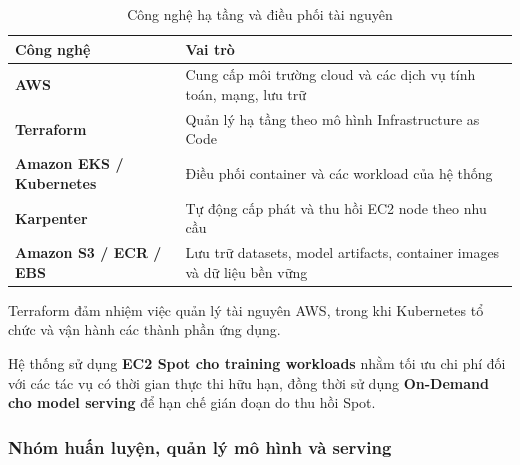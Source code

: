 \begin{table}[!htbp]\centering
\fontsize{12}{15}\selectfont{}
\setlength{\tabcolsep}{4pt}\setlength{\arrayrulewidth}{0.4pt}\renewcommand{\arraystretch}{1.2}
\setlength{\ReportTableWidth}{\dimexpr\linewidth-3\arrayrulewidth\relax}
\begin{tabular}{|L{\tabcolsep\relax}|L{\tabcolsep\relax}|}
\hline
\textbf{Công nghệ} & \textbf{Vai trò} \\
\hline
\textbf{AWS} & Cung cấp môi trường cloud và các dịch vụ tính toán, mạng, lưu trữ \\\hline
\textbf{Terraform} & Quản lý hạ tầng theo mô hình Infrastructure as Code \\\hline
\textbf{Amazon EKS / Kubernetes} & Điều phối container và các workload của hệ thống \\\hline
\textbf{Karpenter} & Tự động cấp phát và thu hồi EC2 node theo nhu cầu \\\hline
\textbf{Amazon S3 / ECR / EBS} & Lưu trữ datasets, model artifacts, container images và dữ liệu bền vững \\\hline
\end{tabular}
\caption{Công nghệ hạ tầng và điều phối tài nguyên}\label{tab:03}
\end{table}

Terraform đảm nhiệm việc quản lý tài nguyên AWS, trong khi Kubernetes tổ chức và vận hành các thành phần ứng dụng.


Hệ thống sử dụng \textbf{EC2 Spot cho training workloads} nhằm tối ưu chi phí đối với các tác vụ có thời gian thực thi hữu hạn, đồng thời sử dụng \textbf{On-Demand cho model serving} để hạn chế gián đoạn do thu hồi Spot.


\subsubsection{Nhóm huấn luyện, quản lý mô hình và serving}


